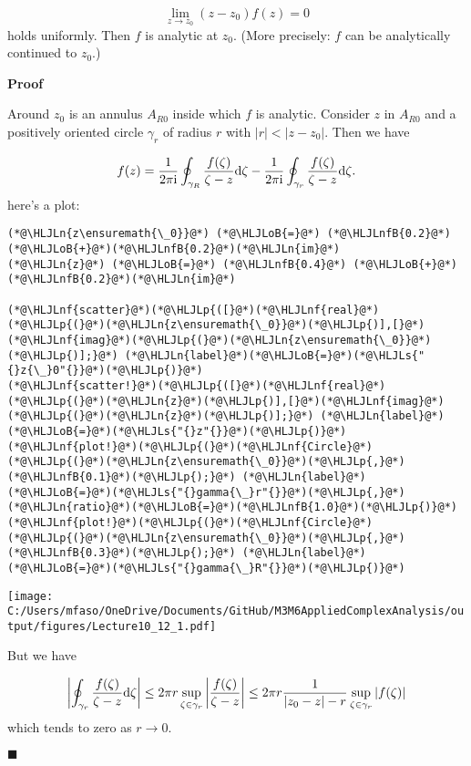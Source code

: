 \documentclass[12pt,a4paper]{article}
\newcommand{\HLJLn}[1]{#1}
\newcommand{\HLJLnf}[1]{\textcolor[RGB]{66,102,213}{#1}}
\newcommand{\HLJLs}[1]{\textcolor[RGB]{201,61,57}{#1}}
\newcommand{\HLJLnfB}[1]{\textcolor[RGB]{59,151,46}{#1}}
\newcommand{\HLJLoB}[1]{\textcolor[RGB]{102,102,102}{\textbf{#1}}}
\newcommand{\HLJLp}[1]{#1}
\def\D{ {\rm d} }
\def\I{ {\rm i} }
\def\C{ {\mathbb C} }
\def\mdblksquare{\blacksquare}
\begin{document}
\[
\lim_{z \rightarrow z_0} (z-z_0) f(z) = 0
\]
holds uniformly. Then $f$ is analytic at $z_0$. (More precisely: $f$ can be analytically continued to $z_0$.)

\textbf{Proof}

Around $z_0$ is an annulus $A_{R0}$ inside which $f$ is analytic. Consider $z$ in $A_{R0}$ and a positively oriented circle $\gamma_r$ of radius $r$ with $|r| < |z-z_0|$. Then we have

\[
    f(z) = {1 \over 2 \pi \I} \oint_{\gamma_R} {f(\zeta) \over \zeta - z} \D \zeta - {1 \over 2 \pi \I} \oint_{\gamma_r} {f(\zeta) \over \zeta - z} \D \zeta .
\]
here's a plot:


\begin{lstlisting}
(*@\HLJLn{z\ensuremath{\_0}}@*) (*@\HLJLoB{=}@*) (*@\HLJLnfB{0.2}@*) (*@\HLJLoB{+}@*)(*@\HLJLnfB{0.2}@*)(*@\HLJLn{im}@*)
(*@\HLJLn{z}@*) (*@\HLJLoB{=}@*) (*@\HLJLnfB{0.4}@*) (*@\HLJLoB{+}@*)(*@\HLJLnfB{0.2}@*)(*@\HLJLn{im}@*)

(*@\HLJLnf{scatter}@*)(*@\HLJLp{([}@*)(*@\HLJLnf{real}@*)(*@\HLJLp{(}@*)(*@\HLJLn{z\ensuremath{\_0}}@*)(*@\HLJLp{)],[}@*)(*@\HLJLnf{imag}@*)(*@\HLJLp{(}@*)(*@\HLJLn{z\ensuremath{\_0}}@*)(*@\HLJLp{)];}@*) (*@\HLJLn{label}@*)(*@\HLJLoB{=}@*)(*@\HLJLs{"{}z{\_}0"{}}@*)(*@\HLJLp{)}@*)
(*@\HLJLnf{scatter!}@*)(*@\HLJLp{([}@*)(*@\HLJLnf{real}@*)(*@\HLJLp{(}@*)(*@\HLJLn{z}@*)(*@\HLJLp{)],[}@*)(*@\HLJLnf{imag}@*)(*@\HLJLp{(}@*)(*@\HLJLn{z}@*)(*@\HLJLp{)];}@*) (*@\HLJLn{label}@*)(*@\HLJLoB{=}@*)(*@\HLJLs{"{}z"{}}@*)(*@\HLJLp{)}@*)
(*@\HLJLnf{plot!}@*)(*@\HLJLp{(}@*)(*@\HLJLnf{Circle}@*)(*@\HLJLp{(}@*)(*@\HLJLn{z\ensuremath{\_0}}@*)(*@\HLJLp{,}@*) (*@\HLJLnfB{0.1}@*)(*@\HLJLp{);}@*) (*@\HLJLn{label}@*)(*@\HLJLoB{=}@*)(*@\HLJLs{"{}gamma{\_}r"{}}@*)(*@\HLJLp{,}@*)(*@\HLJLn{ratio}@*)(*@\HLJLoB{=}@*)(*@\HLJLnfB{1.0}@*)(*@\HLJLp{)}@*)
(*@\HLJLnf{plot!}@*)(*@\HLJLp{(}@*)(*@\HLJLnf{Circle}@*)(*@\HLJLp{(}@*)(*@\HLJLn{z\ensuremath{\_0}}@*)(*@\HLJLp{,}@*) (*@\HLJLnfB{0.3}@*)(*@\HLJLp{);}@*) (*@\HLJLn{label}@*)(*@\HLJLoB{=}@*)(*@\HLJLs{"{}gamma{\_}R"{}}@*)(*@\HLJLp{)}@*)
\end{lstlisting}

\texttt{[image: C:/Users/mfaso/OneDrive/Documents/GitHub/M3M6AppliedComplexAnalysis/output/figures/Lecture10\_12\_1.pdf]}

But we have

\[
    \left|  \oint_{\gamma_r} {f(\zeta) \over \zeta - z} \D \zeta \right| \leq 2\pi r \sup_{\zeta \in \gamma_r} \left|{f(\zeta) \over \zeta - z}\right| \leq 2 \pi r  {1 \over |z_0-z| - r} \sup_{\zeta \in \gamma_r} |f(\zeta)|
\]
which tends to zero as $r \rightarrow 0$.

\ensuremath{\mdblksquare}

% 
% 
% 
%  
\end{document}
